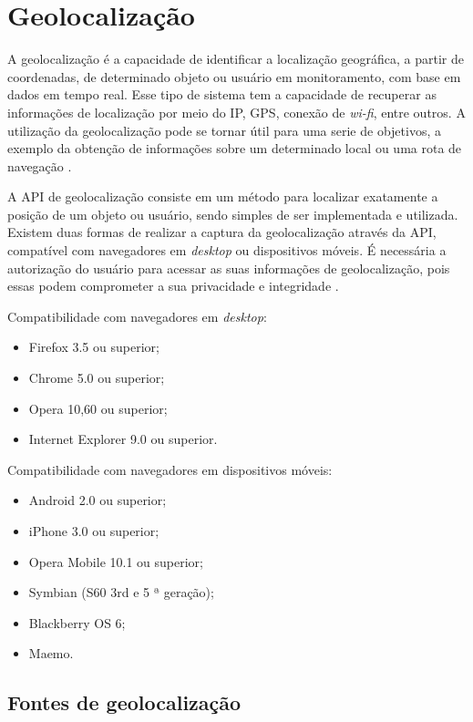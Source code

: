 \section{Geolocalização}
A geolocalização é a capacidade de identificar a localização geográfica, a partir de coordenadas, de determinado objeto ou usuário em monitoramento, com base em dados em tempo real. Esse tipo de sistema tem a capacidade de recuperar as informações de localização por meio do IP, GPS, conexão de \textit{wi-fi}, entre outros. A utilização da geolocalização pode se tornar útil para uma serie de objetivos, a exemplo da obtenção de informações sobre um determinado local ou uma rota de navegação \cite{geolocalizacao:2011}.

A API de geolocalização consiste em um método para localizar exatamente a posição de um objeto ou usuário, sendo simples de ser implementada e utilizada. Existem duas formas de realizar a captura da geolocalização através da API, compatível com navegadores em \textit{desktop} ou dispositivos móveis. É necessária a autorização do usuário para acessar as suas informações de geolocalização, pois essas podem comprometer a sua privacidade e integridade \cite{geolocalizacao:2011}.

Compatibilidade com navegadores em \textit{desktop}:
\begin{itemize}
    \item Firefox 3.5 ou superior;
    \item Chrome 5.0 ou superior;
    \item Opera 10,60 ou superior;
    \item Internet Explorer 9.0 ou superior. \\
\end{itemize}

Compatibilidade com navegadores em dispositivos móveis:
\begin{itemize}
    \item Android 2.0 ou superior;
    \item iPhone 3.0 ou superior;
    \item Opera Mobile 10.1 ou superior;
    \item Symbian (S60 3rd e 5 ª geração);
    \item Blackberry OS 6;
    \item Maemo.
\end{itemize}

\subsection{Fontes de geolocalização}

